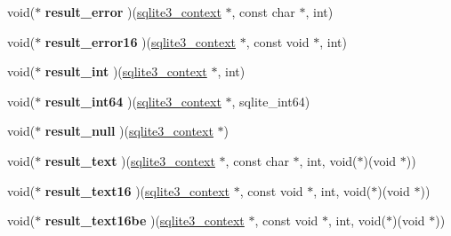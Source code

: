 \begin{DoxyCompactItemize}
\item 
\hypertarget{structsqlite3__api__routines_aa056e7b903ab75742336977a511ef14c}{void($\ast$ {\bfseries result\-\_\-error} )(\hyperlink{structsqlite3__context}{sqlite3\-\_\-context} $\ast$, const char $\ast$, int)}\label{structsqlite3__api__routines_aa056e7b903ab75742336977a511ef14c}

\item 
\hypertarget{structsqlite3__api__routines_a70665eda481c4fcafdfd1462700be04e}{void($\ast$ {\bfseries result\-\_\-error16} )(\hyperlink{structsqlite3__context}{sqlite3\-\_\-context} $\ast$, const void $\ast$, int)}\label{structsqlite3__api__routines_a70665eda481c4fcafdfd1462700be04e}

\item 
\hypertarget{structsqlite3__api__routines_aca3c3c95e95664898bf88da2e509e5af}{void($\ast$ {\bfseries result\-\_\-int} )(\hyperlink{structsqlite3__context}{sqlite3\-\_\-context} $\ast$, int)}\label{structsqlite3__api__routines_aca3c3c95e95664898bf88da2e509e5af}

\item 
\hypertarget{structsqlite3__api__routines_a92556e67d3485c59031e3d3acf401501}{void($\ast$ {\bfseries result\-\_\-int64} )(\hyperlink{structsqlite3__context}{sqlite3\-\_\-context} $\ast$, sqlite\-\_\-int64)}\label{structsqlite3__api__routines_a92556e67d3485c59031e3d3acf401501}

\item 
\hypertarget{structsqlite3__api__routines_a00666e8dbc927015e5885d8397fe87b5}{void($\ast$ {\bfseries result\-\_\-null} )(\hyperlink{structsqlite3__context}{sqlite3\-\_\-context} $\ast$)}\label{structsqlite3__api__routines_a00666e8dbc927015e5885d8397fe87b5}

\item 
\hypertarget{structsqlite3__api__routines_aab7d23eb300244a843b8b88f07253b17}{void($\ast$ {\bfseries result\-\_\-text} )(\hyperlink{structsqlite3__context}{sqlite3\-\_\-context} $\ast$, const char $\ast$, int, void($\ast$)(void $\ast$))}\label{structsqlite3__api__routines_aab7d23eb300244a843b8b88f07253b17}

\item 
\hypertarget{structsqlite3__api__routines_a65aabe03e23304ceb885829bf2393aa5}{void($\ast$ {\bfseries result\-\_\-text16} )(\hyperlink{structsqlite3__context}{sqlite3\-\_\-context} $\ast$, const void $\ast$, int, void($\ast$)(void $\ast$))}\label{structsqlite3__api__routines_a65aabe03e23304ceb885829bf2393aa5}

\item 
\hypertarget{structsqlite3__api__routines_a328415dd9961d9e0d6b15a76fe134b9d}{void($\ast$ {\bfseries result\-\_\-text16be} )(\hyperlink{structsqlite3__context}{sqlite3\-\_\-context} $\ast$, const void $\ast$, int, void($\ast$)(void $\ast$))}\label{structsqlite3__api__routines_a328415dd9961d9e0d6b15a76fe134b9d}


\end{DoxyCompactItemize}
